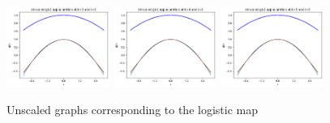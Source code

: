 \begin{exmp}
\begin{figure}
    \\
    \includegraphics[width=0.3\textwidth]{Feigenbaum Approx Graphs/Unscaled Graphs/us k=3.png}
    \includegraphics[width=0.3\textwidth]{Feigenbaum Approx Graphs/Unscaled Graphs/us k=4.png}
    \includegraphics[width=0.3\textwidth]{Feigenbaum Approx Graphs/Unscaled Graphs/us k=5.png}
    \caption{Unscaled graphs corresponding to the logistic map}
    \label{fig:unscaled}
\end{figure}
    


\end{exmp}
